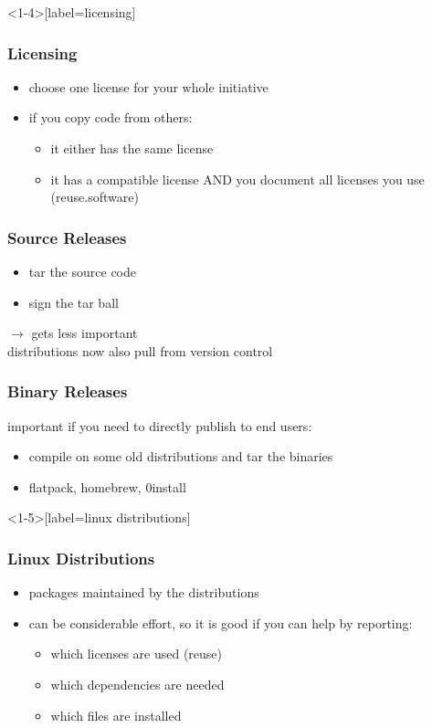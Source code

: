 \begin{frame}<1-4>[label=licensing]
	\frametitle{Licensing}

	\begin{itemize}[<+-| alert@+>]
	\item choose one license for your whole initiative
	\item if you copy code from others:
	\begin{itemize}
	\item it either has the same license
	\item it has a compatible license AND you document all licenses you use (reuse.software)
	\end{itemize}
	\end{itemize}
\end{frame}

\begin{frame}
	\frametitle{Source Releases}

	\begin{itemize}[<+-| alert@+>]
	\item tar the source code
	\item sign the tar ball
	\end{itemize}

	\pause[\thebeamerpauses]  %
	\vspace{1cm}

	$\rightarrow$ gets less important \\
	distributions now also pull from version control
\end{frame}

\begin{frame}
	\frametitle{Binary Releases}

	important if you need to directly publish to end users:

	\begin{itemize}[<+-| alert@+>]
	\item compile on some old distributions and tar the binaries
	\item flatpack, homebrew, 0install
	\end{itemize}
\end{frame}

\begin{frame}<1-5>[label=linux distributions]
	\frametitle{Linux Distributions}

	\begin{itemize}[<+-| alert@+>]
	\item packages maintained by the distributions
	\item can be considerable effort, so it is good if you can help by reporting:
	\begin{itemize}
	\item which licenses are used (reuse)
	\item which dependencies are needed
	\item which files are installed
	\end{itemize}
	\end{itemize}
\end{frame}

